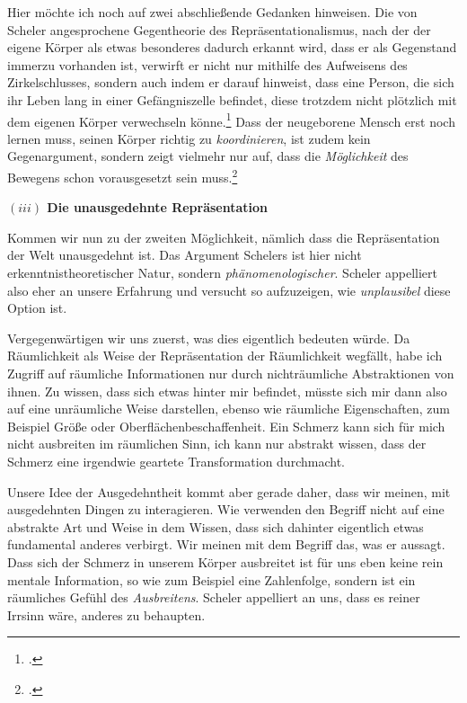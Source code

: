 \documentclass[a4paper, 12pt]{article}
\begin{document}
\begin{onehalfspace}
Hier möchte ich noch auf zwei abschließende Gedanken hinweisen. Die von Scheler angesprochene Gegentheorie des Repräsentationalismus, nach der der eigene Körper als etwas besonderes dadurch erkannt wird, dass er als Gegenstand immerzu vorhanden ist, verwirft er nicht nur mithilfe des Aufweisens des Zirkelschlusses, sondern auch indem er darauf hinweist, dass eine Person, die sich ihr Leben lang in einer Gefängniszelle befindet, diese trotzdem nicht plötzlich mit dem eigenen Körper verwechseln könne.\footnote{\Cite[Vgl.][S. 494]{scheler-ethik}.} Dass der neugeborene Mensch erst noch lernen muss, seinen Körper richtig zu \emph{koordinieren}, ist zudem kein Gegenargument, sondern zeigt vielmehr nur auf, dass die \emph{Möglichkeit} des Bewegens schon vorausgesetzt sein muss.\footnote{\Cite[Vgl.][S. 492]{scheler-ethik}.} 


\vspace{5mm}
\noindent\textbf{$(iii)$ Die unausgedehnte Repräsentation}


\noindent Kommen wir nun zu der zweiten Möglichkeit, nämlich dass die Repräsentation der Welt unausgedehnt ist. Das Argument Schelers ist hier nicht erkenntnistheoretischer Natur, sondern \emph{phänomenologischer}. Scheler appelliert also eher an unsere Erfahrung und 	versucht so aufzuzeigen, wie \emph{unplausibel} diese Option ist.


Vergegenwärtigen wir uns zuerst, was dies eigentlich bedeuten würde. Da Räumlichkeit als Weise der Repräsentation der Räumlichkeit wegfällt, habe ich Zugriff auf räumliche Informationen nur durch nichträumliche Abstraktionen von ihnen. Zu wissen, dass sich etwas hinter mir befindet, müsste sich mir dann also auf eine unräumliche Weise darstellen, ebenso wie räumliche Eigenschaften, zum Beispiel Größe oder Oberflächenbeschaffenheit. Ein Schmerz kann sich für mich nicht ausbreiten im räumlichen Sinn, ich kann nur abstrakt wissen, dass der Schmerz eine irgendwie geartete Transformation durchmacht. 

Unsere Idee der Ausgedehntheit kommt aber gerade daher, dass wir meinen, mit ausgedehnten Dingen zu interagieren. Wie verwenden den Begriff nicht auf eine abstrakte Art und Weise in dem Wissen, dass sich dahinter eigentlich etwas fundamental anderes verbirgt. Wir meinen mit dem Begriff das, was er aussagt. Dass sich der Schmerz in unserem Körper ausbreitet ist für uns eben keine rein mentale Information, so wie zum Beispiel eine Zahlenfolge, sondern ist ein räumliches Gefühl des \emph{Ausbreitens}. Scheler appelliert an uns, dass es reiner Irrsinn wäre, anderes zu behaupten. 


\end{onehalfspace}
\end{document}
